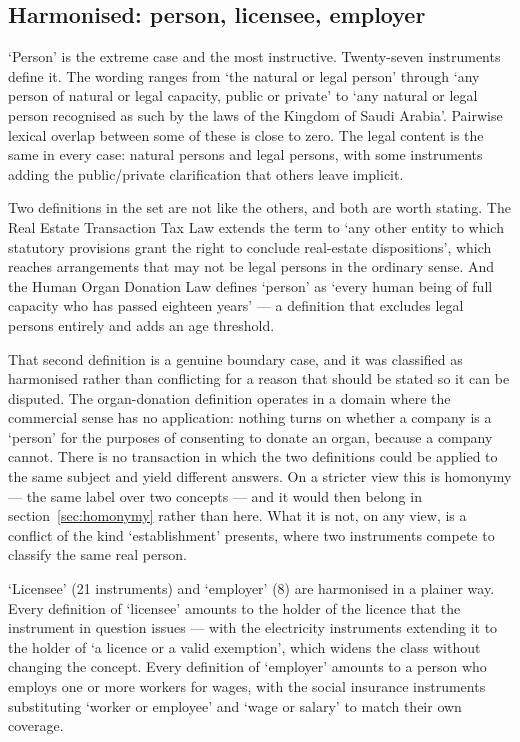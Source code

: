 \documentclass[11pt]{article}
\begin{document}
\subsection{Harmonised: person, licensee, employer}
\label{sec:harmonised}

`Person' is the extreme case and the most instructive. Twenty-seven
instruments define it. The wording ranges from `the natural or legal person'
through `any person of natural or legal capacity, public or private' to `any
natural or legal person recognised as such by the laws of the Kingdom of
Saudi Arabia'. Pairwise lexical overlap between some of these is close to
zero. The legal content is the same in every case: natural persons and legal
persons, with some instruments adding the public/private clarification that
others leave implicit.

Two definitions in the set are not like the others, and both are worth
stating. The Real Estate Transaction Tax Law extends the term to `any other
entity to which statutory provisions grant the right to conclude real-estate
dispositions', which reaches arrangements that may not be legal persons in
the ordinary sense. And the Human Organ Donation Law defines `person' as
`every human being of full capacity who has passed eighteen years' --- a
definition that excludes legal persons entirely and adds an age threshold.

That second definition is a genuine boundary case, and it was classified as
harmonised rather than conflicting for a reason that should be stated so it
can be disputed. The organ-donation definition operates in a domain where the
commercial sense has no application: nothing turns on whether a company is a
`person' for the purposes of consenting to donate an organ, because a company
cannot. There is no transaction in which the two definitions could be applied
to the same subject and yield different answers. On a stricter view this is
homonymy --- the same label over two concepts --- and it would then belong in
section~\ref{sec:homonymy} rather than here. What it is not, on any view, is a conflict of
the kind `establishment' presents, where two instruments compete to classify
the same real person.

`Licensee' (21 instruments) and `employer' (8) are harmonised in a plainer
way. Every definition of `licensee' amounts to the holder of the licence that
the instrument in question issues --- with the electricity instruments
extending it to the holder of `a licence or a valid exemption', which widens
the class without changing the concept. Every definition of `employer'
amounts to a person who employs one or more workers for wages, with the
social insurance instruments substituting `worker or employee' and `wage or
salary' to match their own coverage.
\end{document}
